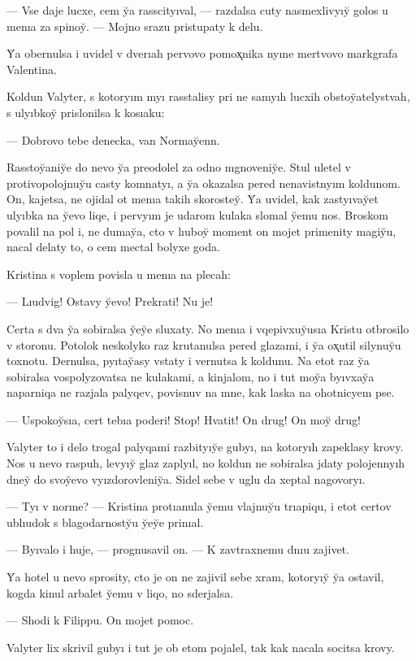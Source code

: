 \documentclass[10pt]{book}
\begin{document}
— Vse daje lucxe, cem y̆a rasscityıval, — razdalsa cuty nasmexlivyıy̆ golos u menıa za spinoy̆. — Mojno srazu pristupaty k delu.

Y̆a obernulsa i uvidel v dverıah pervovo pomox̨nika nyıne mertvovo markgrafa Valentina.

Koldun Valyter, s kotoryım myı rasstalisy pri ne samyıh lucxih obstoy̆atelystvah, s ulyıbkoy̆ prislonilsa k kosıaku:

— Dobrovo tebe denecka, van Normay̆enn.

Rasstoy̆aniy̆e do nevo y̆a preodolel za odno mgnoveniy̆e. Stul uletel v protivopolojnuy̆u casty komnatyı, a y̆a okazalsa pered nenavistnyım koldunom. On, kajetsa, ne ojidal ot menıa takih skorostey̆. Y̆a uvidel, kak zastyıvay̆et ulyıbka na y̆evo liqe, i pervyım je udarom kulaka slomal y̆emu nos. Broskom povalil na pol i, ne dumay̆a, cto v lıuboy̆ moment on mojet primenity magiy̆u, nacal delaty to, o cem mectal bolyxe goda.

Kristina s voplem povisla u menıa na plecah:

— Lıudvig! Ostavy y̆evo! Prekrati! Nu je!

Certa s dva y̆a sobiralsa y̆ey̆e sluxaty. No menıa i vqepivxuy̆usıa Kristu otbrosilo v storonu. Potolok neskolyko raz krutanulsa pered glazami, i y̆a ox̨util silynuy̆u toxnotu. Dernulsa, pyıtay̆asy vstaty i vernutsa k koldunu. Na etot raz y̆a sobiralsa vospolyzovatsa ne kulakami, a kinjalom, no i tut moy̆a byıvxay̆a naparniqa ne razjala palyqev, povisnuv na mne, kak laska na ohotnicyem pse.

— Uspokoy̆sıa, cert tebıa poderi! Stop! Hvatit! On drug! On moy̆ drug!



Valyter to i delo trogal palyqami razbityıy̆e gubyı, na kotoryıh zapeklasy krovy. Nos u nevo raspuh, levyıy̆ glaz zaplyıl, no koldun ne sobiralsa jdaty polojennyıh dney̆ do svoy̆evo vyızdorovleniy̆a. Sidel sebe v uglu da xeptal nagovoryı.

— Tyı v norme? — Kristina protıanula y̆emu vlajnuy̆u trıapiqu, i etot certov ublıudok s blagodarnosty̆u y̆ey̆e prinıal.

— Byıvalo i huje, — prognusavil on. — K zavtraxnemu dnıu zajivet.

Y̆a hotel u nevo sprosity, cto je on ne zajivil sebe xram, kotoryıy̆ y̆a ostavil, kogda kinul arbalet y̆emu v liqo, no sderjalsa.

— Shodi k Filippu. On mojet pomoc.

Valyter lix skrivil gubyı i tut je ob etom pojalel, tak kak nacala socitsa krovy.
\end{document}
